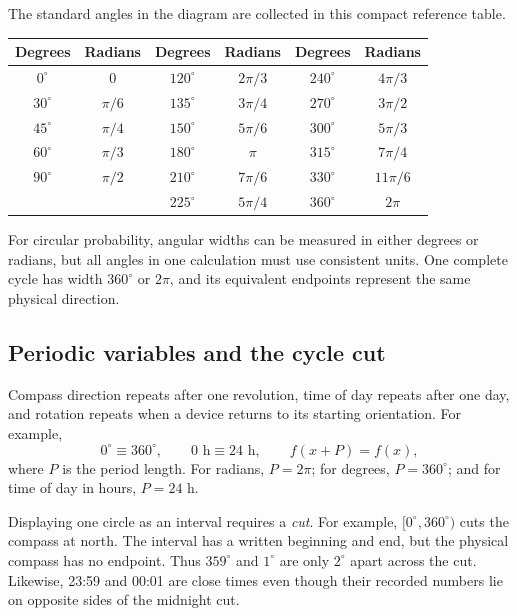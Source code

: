 	The standard angles in the diagram are collected in this compact reference
	table.
	\begin{center}
		\small
		\renewcommand{\arraystretch}{1.15}
		\begin{tabular}{c|c@{\qquad}c|c@{\qquad}c|c}
			\textbf{Degrees} & \textbf{Radians} & \textbf{Degrees} & \textbf{Radians}
				& \textbf{Degrees} & \textbf{Radians} \\ \hline
			$0^\circ$   & $0$       & $120^\circ$ & $2\pi/3$  & $240^\circ$ & $4\pi/3$  \\
			$30^\circ$  & $\pi/6$   & $135^\circ$ & $3\pi/4$  & $270^\circ$ & $3\pi/2$  \\
			$45^\circ$  & $\pi/4$   & $150^\circ$ & $5\pi/6$  & $300^\circ$ & $5\pi/3$  \\
			$60^\circ$  & $\pi/3$   & $180^\circ$ & $\pi$     & $315^\circ$ & $7\pi/4$  \\
			$90^\circ$  & $\pi/2$   & $210^\circ$ & $7\pi/6$  & $330^\circ$ & $11\pi/6$ \\
			                 &           & $225^\circ$ & $5\pi/4$  & $360^\circ$ & $2\pi$
		\end{tabular}
	\end{center}

	For circular probability, angular widths can be measured in either degrees or
	radians, but all angles in one calculation must use consistent units.  One
	complete cycle has width $360^\circ$ or $2\pi$, and its equivalent endpoints
	represent the same physical direction.

	\subsection{Periodic variables and the cycle cut}\label{sec:c3-intro-periodic}
	Compass direction repeats after one revolution, time of day repeats after one
	day, and rotation repeats when a device returns to its starting orientation.
	For example,
	\[
	0^\circ\equiv360^\circ,
	\qquad 0\text{ h}\equiv24\text{ h},
	\qquad f(x+P)=f(x),
	\]
	where $P$ is the period length.  For radians, $P=2\pi$; for degrees,
	$P=360^\circ$; and for time of day in hours, $P=24$ h.
	
	Displaying one circle as an interval requires a \emph{cut}.  For example,
	$[0^\circ,360^\circ)$ cuts the compass at north.  The interval has a written
	beginning and end, but the physical compass has no endpoint.  Thus
	$359^\circ$ and $1^\circ$ are only $2^\circ$ apart across the cut.  Likewise,
	23:59 and 00:01 are close times even though their recorded numbers lie on
	opposite sides of the midnight cut.
	
